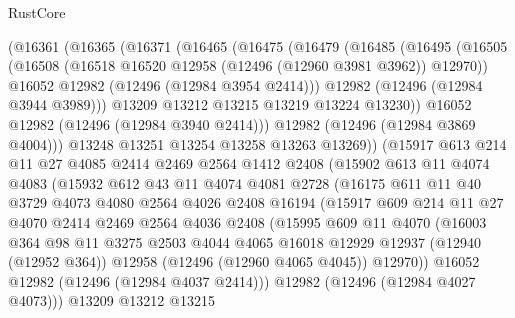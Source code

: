 \begin{lexlean}{RustCore}
\begin{coremodule}
      (@16361
        (@16365
          (@16371
            (@16465
              (@16475
                (@16479
                  (@16485
                    (@16495
                      (@16505
                        (@16508 (@16518 @16520 @12958 (@12496 (@12960 @3981 @3962)) @12970))
                        @16052
                        @12982
                        (@12496 (@12984 @3954 @2414)))
                      @12982
                      (@12496 (@12984 @3944 @3989)))
                    @13209
                    @13212
                    @13215
                    @13219
                    @13224
                    @13230))
                @16052
                @12982
                (@12496 (@12984 @3940 @2414)))
              @12982
              (@12496 (@12984 @3869 @4004)))
            @13248
            @13251
            @13254
            @13258
            @13263
            @13269))
        (@15917
          @613
          @214
          @11
          @27
          @4085
          @2414
          @2469
          @2564
          @1412
          @2408
          (@15902
            @613
            @11
            @4074
            @4083
            (@15932
              @612
              @43
              @11
              @4074
              @4081
              @2728
              (@16175
                @611
                @11
                @40
                @3729
                @4073
                @4080
                @2564
                @4026
                @2408
                @16194
                (@15917
                  @609
                  @214
                  @11
                  @27
                  @4070
                  @2414
                  @2469
                  @2564
                  @4036
                  @2408
                  (@15995
                    @609
                    @11
                    @4070
                    (@16003
                      @364
                      @98
                      @11
                      @3275
                      @2503
                      @4044
                      @4065
                      @16018
                      @12929
                      @12937
                      (@12940 (@12952 @364))
                      @12958
                      (@12496 (@12960 @4065 @4045))
                      @12970))
                  @16052
                  @12982
                  (@12496 (@12984 @4037 @2414)))
                @12982
                (@12496 (@12984 @4027 @4073)))
              @13209
              @13212
              @13215

\end{coremodule}
\end{lexlean}

